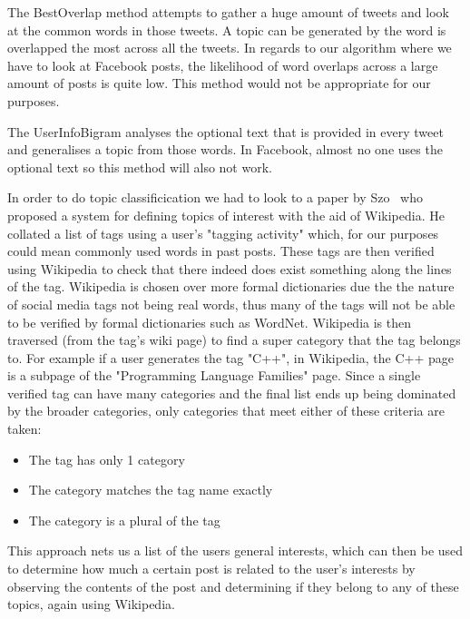The BestOverlap method attempts to gather a huge amount of tweets and look at the common words in those tweets. A topic can be generated by the word is overlapped the most across all the tweets. In regards to our algorithm where we have to look at Facebook posts, the likelihood of word overlaps across a large amount of posts is quite low. This method would not be appropriate for our purposes.

The UserInfoBigram analyses the optional text that is provided in every tweet and generalises a topic from those words. In Facebook, almost no one uses the optional text so this method will also not work.

In order to do topic classificication we had to look to a paper by Szo~\cite{szomszor2008semantic} who proposed a system for defining topics of interest with the aid of Wikipedia. He collated a list of tags using a user's "tagging activity" which, for our purposes could mean commonly used words in past posts. These tags are then verified using Wikipedia to check that there indeed does exist something along the lines of the tag. Wikipedia is chosen over more formal dictionaries due the the nature of social media tags not being real words, thus many of the tags will not be able to be verified by formal dictionaries such as WordNet. Wikipedia is then traversed (from the tag's wiki page) to find a super category that the tag belongs to. For example if a user generates the tag "C++", in Wikipedia, the C++ page is a subpage of the "Programming Language Families" page. 
Since a single verified tag can have many categories and the final list ends up being dominated by the broader categories, only categories that meet either of these criteria are taken:
\begin{itemize}
 \item The tag has only 1 category
 \item The category matches the tag name exactly
 \item The category is a plural of the tag
\end{itemize}

This approach nets us a list of the users general interests, which can then be used to determine how much a certain post is related to the user's interests by observing the contents of the post and determining if they belong to any of these topics, again using Wikipedia.

